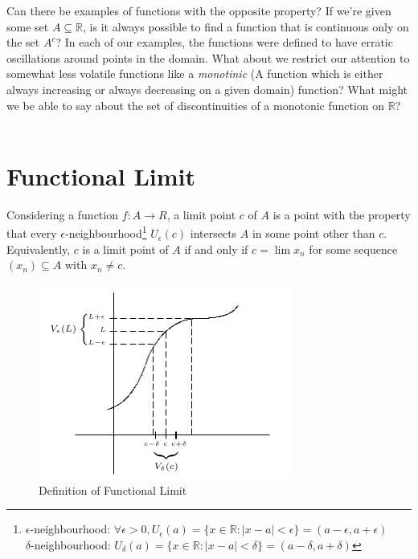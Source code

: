 \documentclass[12pt]{article}
\begin{document}
\quad Can there be examples of functions with the opposite property? If we're given some set $A \subseteq \mathbb{R}$, is it always possible to find a function that is continuous only on the set $A^c$? In each of our examples, the functions were defined to have erratic oscillations around points in the domain. What about we restrict our attention to somewhat less volatile functions like a \textit{monotinic} (A function which is either always increasing or always decreasing on a given domain) function? What might we be able to say about the set of discontinuities of a monotonic function on $\mathbb{R}$? \\~\\

\begin{center}
\end{center}

\section{Functional Limit}
Considering a function $f:A \to R$, a limit point $c$ of $A$ is a point with the property that every $\epsilon$-neighbourhood\footnote{     $\epsilon$-neighbourhood: 
    $ \forall \epsilon > 0, U_\epsilon (a) = \{ x\in\mathbb{R} : |x-a| < \epsilon \} = (a-\epsilon, a+\epsilon)  $ \\
    \quad$\delta$-neighbourhood: $ U_\delta(a) = \{x \in \mathbb{R} : |x-a| < \delta \} = (a-\delta, a+\delta) $
} $U_\epsilon(c)$ intersects $A$ in some point other than $c$. Equivalently, $c$ is a limit point of $A$  if and only if $c=\lim x_n$ for some sequence $(x_n) \subseteq A$ with $x_n \neq c$. \\
\begin{figure}[htpb]
    \centering
    \includegraphics[scale=0.5]{Functional Limit Definition.png}
    \caption{\small Definition of Functional Limit}
\end{figure}
\end{document}
